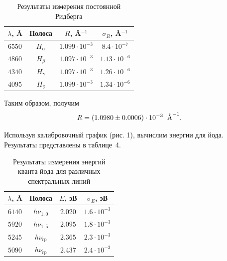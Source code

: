 \documentclass[a4paper]{article}
\begin{document}
\begin{table}[!ht]
    \centering
    \begin{tabular}{|c|c|c|c|}
    \hline
    $\lambda$, \r{A} & Полоса       & $R$, \r{A}$^{-1}$ & $\sigma_R$, \r{A}$^{-1}$ \\ \hline
    $6550$                            & $H_{\alpha}$ & $1.099 \cdot 10^{-3}$              & $8.4 \cdot 10^{-7}$                       \\ \hline
    $4860$                            & $H_{\beta}$  & $1.097 \cdot 10^{-3}$              & $1.13 \cdot 10^{-6}$                      \\ \hline
    $4340$                            & $H_{\gamma}$ & $1.097 \cdot 10^{-3}$              & $1.26 \cdot 10^{-6}$                      \\ \hline
    $4095$                            & $H_{\delta}$ & $1.099 \cdot 10^{-3}$              & $1.34 \cdot 10^{-6}$                      \\ \hline
    \end{tabular}
    \caption{Результаты измерения постоянной Ридберга}
\end{table} 

\noindent Таким образом, получим
\begin{equation}
    R = (1.0980 \pm 0.0006) \cdot 10^{-3} \;\; \text{\r{A}}^{-1}.
\end{equation}

\noindent Используя калибровочный график (рис. 1), вычислим энергии для йода. Результаты представлены в таблице~4.
\begin{table}[!ht]
    \centering
    \begin{tabular}{|c|c|c|c|}
    \hline
    $\lambda$, \r{A} & Полоса             & $E$, эВ & $\sigma_E$, эВ      \\ \hline
    $6140$    & $h\nu_{1,0}$       & $2.020$  & $1.6 \cdot 10^{-3}$ \\ \hline
    $5920$    & $h\nu_{1,5}$        & $2.095$  & $1.8 \cdot 10^{-3}$ \\ \hline
    $5245$    & $h\nu_{\text{гр}}$ & $2.365$  & $2.3 \cdot 10^{-3}$ \\ \hline
    $5090$    & $h\nu_{\text{гр}}$ & $2.437$  & $2.4 \cdot 10^{-3}$ \\ \hline
    \end{tabular}
    \caption{Результаты измерения энергий кванта йода для различных спектральных линий}
\end{table}
\end{document}
